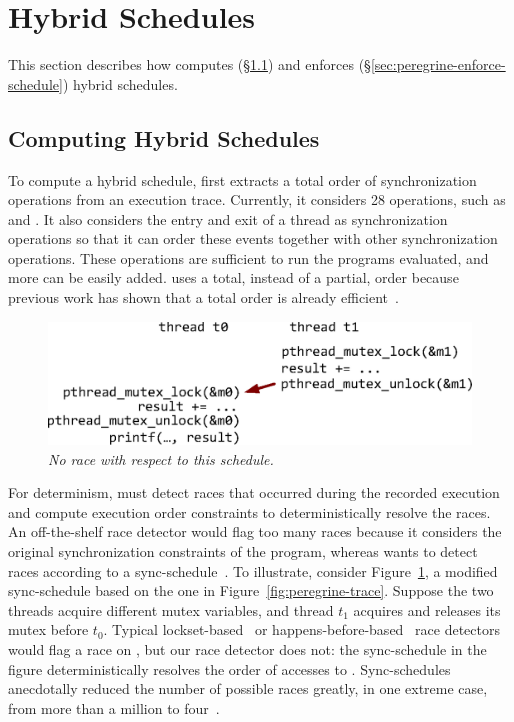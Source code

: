 \section{Hybrid Schedules} \label{sec:peregrine-schedule}

This section describes how \peregrine computes (\S\ref{sec:peregrine-compute-schedule})
and enforces (\S\ref{sec:peregrine-enforce-schedule}) hybrid schedules.

\subsection{Computing Hybrid Schedules} \label{sec:peregrine-compute-schedule}

To compute a hybrid schedule, \peregrine first extracts a total order of
synchronization operations from an execution trace.  Currently, it
considers 28  operations, such as 
and .  It also considers
the entry and exit of a thread as synchronization operations so that it can
order these events together with other synchronization operations.  These
operations are sufficient to run the programs evaluated, and more can be
easily added.  \peregrine uses a total, instead of a partial, order because
previous work has shown that a total order is already
efficient~\cite{cui:tern:osdi10,kendo:asplos09}.

\begin{figure}[t]
\centering
\includegraphics[width=.9\columnwidth]{peregrine/figures/concurrent-intervals.eps}
\caption{{\em No \peregrine race with respect to this
    schedule.}} \label{fig:peregrine-concurrent-intervals}
\end{figure}

For determinism, \peregrine must detect races that occurred during the recorded
execution and compute execution order constraints to deterministically
resolve the races.  An off-the-shelf race detector would flag too many
races because it considers the original synchronization
constraints of the program, whereas \peregrine wants to detect races according
to a sync-schedule~\cite{pres:sosp09,recplay:tocs}.  To illustrate,
consider Figure~\ref{fig:peregrine-concurrent-intervals}, a modified sync-schedule
based on the one in Figure~\ref{fig:peregrine-trace}.  Suppose the two threads
acquire different mutex variables, and thread $t_1$ acquires and releases
its mutex before $t_0$.  Typical lockset-based~\cite{savage:eraser}
or happens-before-based~\cite{lamportclock} race detectors would flag a
race on , but our race detector does not: the sync-schedule
in the figure deterministically resolves the order of accesses to .  
Sync-schedules anecdotally reduced the number of
possible races greatly, in one extreme case, from more than a million to
four~\cite{pres:sosp09}.


